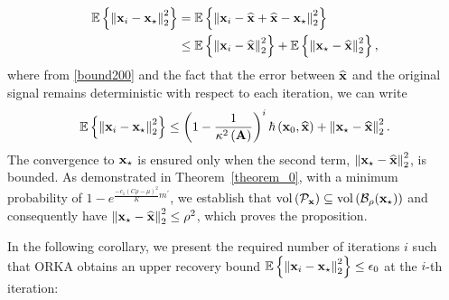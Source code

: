 \documentclass[12pt,draftcls,onecolumn]{IEEEtran}
\begin{document}
\begin{IEEEproof}
\begin{equation}
\begin{aligned}
\mathbb{E}\left\{\left\|\mathbf{x}_i-\mathbf{x}_{\star}\right\|^2_{2}\right\} &= \mathbb{E}\left\{\left\|\mathbf{x}_i-\widehat{\mathbf{x}}+\widehat{\mathbf{x}}-\mathbf{x}_{\star}\right\|^2_{2}\right\}\\&\leq \mathbb{E}\left\{\left\|\mathbf{x}_i-\widehat{\mathbf{x}}\right\|^2_{2}\right\} + \mathbb{E}\left\{\left\|\mathbf{x}_{\star}-\widehat{\mathbf{x}}\right\|^2_{2}\right\},
\end{aligned}   
\end{equation}
where from  \eqref{bound200} and the fact that the error between $\widehat{\mathbf{x}}$ and the original signal remains deterministic with respect to each iteration, we can write
\begin{equation}
\begin{aligned}
\mathbb{E}\left\{\left\|\mathbf{x}_i-\mathbf{x}_{\star}\right\|^2_{2}\right\} \leq \left(1-\frac{1}{\kappa^{2}\left(\mathbf{A}\right)}\right)^{i} \hbar\left(\mathbf{x}_{0},\widehat{\mathbf{x}}\right) + \left\|\mathbf{x}_{\star}-\widehat{\mathbf{x}}\right\|^2_{2}.
\end{aligned}
\end{equation}
The convergence to $\mathbf{x}_{\star}$ is ensured only when the second term, $\left\|\mathbf{x}_{\star}-\widehat{\mathbf{x}}\right\|^2_{2}$, is bounded. As demonstrated in Theorem~\ref{theorem_0}, with a minimum probability of $1-e^{\frac{-c_1\left(C\rho-\mu\right)^{2}}{K}m^{\prime}}$, we establish that $\operatorname{vol}\left(\mathcal{P}_{\mathbf{x}}\right) \subseteq \operatorname{vol}\left(\mathcal{B}_{\rho}(\mathbf{x}_{\star})\right)$ and consequently have $\left\|\mathbf{x}_{\star}-\widehat{\mathbf{x}}\right\|^2_{2} \leq \rho^2$, which proves the proposition. 

\end{IEEEproof}
In the following corollary, we present the required number of iterations $i$
such that ORKA obtains an upper recovery bound $\mathbb{E}\left\{\left\|\mathbf{x}_{i}-\mathbf{x}_{\star}\right\|^2_2\right\}\leq \epsilon_0$ at the $i$-th iteration:
\end{document}
